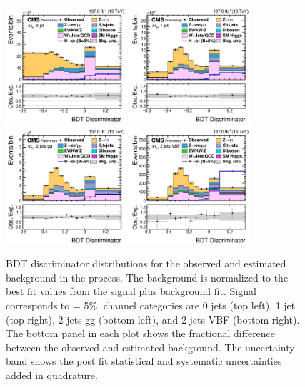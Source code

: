 \begin{figure}[htbp!]
  \centering
  \includegraphics[width=0.4\textwidth]{plots/chapter9/BDT/etau/0jet.png}
  \includegraphics[width=0.4\textwidth]{plots/chapter9/BDT/etau/1jet.png} \\
  \includegraphics[width=0.4\textwidth]{plots/chapter9/BDT/etau/2jet_gg.png}
  \includegraphics[width=0.4\textwidth]{plots/chapter9/BDT/etau/2jet_vbf.png} \\
  \caption{BDT discriminator distributions for the observed and estimated background in the \Hehad process. The background is normalized to the best fit values from the signal plus background fit. Signal corresponds to \BHet = 5\%. \Hehad channel categories are 0 jets (top left), 1 jet (top right), 2 jets gg (bottom left), and 2 jets VBF (bottom right). The bottom panel in each plot shows the fractional difference between the observed and estimated background. The uncertainty band shows the post fit statistical and systematic uncertainties added in quadrature.}
  \label{fig:bdt_ehad}
\end{figure}

